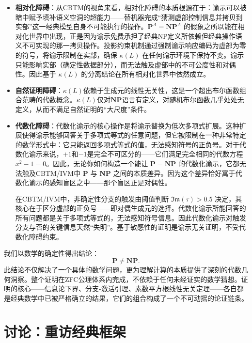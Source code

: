 \documentclass{ctexart}
\begin{document}
	\begin{itemize}
		\item \textbf{相对化障碍}：从CBTM的视角来看，相对化障碍的本质根源在于：谕示可以被暗中赋予填补语义空洞的超能力——替机器完成“猜测虚部控制信息并拷贝到实部”这一经典模型自身不可能执行的操作。$\mathbf{P}^A = \mathbf{NP}^A$ 的假象之所以能在相对化世界中出现，正是因为谕示免费承担了经典NP定义所依赖但经典操作语义不可实现的那一拷贝操作。投影约束机制通过强制谕示响应编码为虚部为零的符号，将谕示限制在实部，确保 $\kappa(L)$ 在任何谕示环境下保持不变。谕示只能影响实部（确定性数据部分），而无法触及虚部中的不可公度性和对偶性。因此基于 $\kappa(L)$ 的分离结论在所有相对化世界中依然成立。
		
		\item \textbf{自然证明障碍}：$\kappa(L)$依赖于生成元的线性无关性，这是一个超出布尔函数组合范畴的代数概念。$\kappa(L)$仅对$\mathbf{NP}$语言有定义，对随机布尔函数几乎处处无定义，从而不满足自然证明的``大尺度''条件。
		
		\item \textbf{代数化障碍}：代数化谕示的核心操作是将谕示替换为低次多项式扩展。这种扩展使得谕示能够回答关于多项式等式的任意问题，但它被限制在一种非常特定的数学形式中：它只能返回多项式等式的值，无法感知符号的正负号。对于代数化谕示来说，$+1$和$-1$是完全不可区分的——它们满足完全相同的代数方程 $x^2-1=0$。因此，无论你如何构造一个能让 $\mathbf{P}=\mathbf{NP}$ 的代数化谕示，它都无法触及CBTM/IVM中 $\mathbf{P}$ 与 $\mathbf{NP}$ 之间的本质差异。因为这个差异恰好寓于代数化谕示的感知盲区之中——那个盲区正是对偶性。
		
		在CBTM/IVM中，非确定性分支的触发由阈值判断 $\mathfrak{Im}(\tau) > 0.5$ 决定，其核心在于区分虚部的正负号——即对偶生成元的选择。代数化谕示所能回答的所有问题都是关于多项式等式的，无法感知符号信息。因此代数化谕示对触发分支与否的关键信息天然``失明''。基于敏感性的证明是谕示无关证明，不受代数化障碍约束。
	\end{itemize}
	
	我们以数学的确定性得出结论：
	\[
	\boxed{\mathbf{P} \neq \mathbf{NP}}.
	\]
	此结论不仅解决了一个具体的数学问题，更为理解计算的本质提供了深刻的代数几何洞察。整个证明在ZFC公理体系内完成，不依赖于任何未经证实的数学猜想。证明的核心——信息论下界、分支-激活引理、素数平方根线性无关定理——各自都是经典数学中已被严格确立的结果，它们的组合构成了一个不可动摇的论证链条。
	
	\section{讨论：重访经典框架}
	
\end{document}
